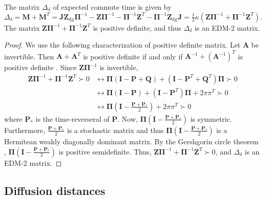 \begin{proposition}
  \label{prop:10}
  The matrix $\Delta_{\delta}$ of expected commute time is given by 
  \begin{equation}
    \label{eq:33}
 \Delta_{\delta} = \bm{M} + \bm{M}^{T}
  = \bm{J}\bm{Z}_{\mathrm{dg}}\bm{\Pi}^{-1} - \bm{Z}\bm{\Pi}^{-1} -
  \bm{\Pi}^{-1}\bm{Z}^{T} - \bm{\Pi}^{-1}\bm{Z}_{\mathrm{dg}} \bm{J} =
  \tfrac{1}{2} \kappa(\bm{Z}\bm{\Pi}^{-1} +
  \bm{\Pi}^{-1}\bm{Z}^{T}).   
  \end{equation}
  The matrix $\bm{Z}\bm{\Pi}^{-1} + \bm{\Pi}^{-1}\bm{Z}^{T}$ is
  positive definite, and thus $\Delta_{\delta}$ is an EDM-2
  matrix.
\end{proposition}
\begin{proof}
  We use the following characterization of positive definite
  matrix. Let $\bm{A}$ be invertible. Then $\bm{A} + \bm{A}^{T}$ is positive definite if and only if
  $\bm{A}^{-1} + (\bm{A}^{-1})^{T}$ is positive definite
  \cite{horn94:_topic_in_matrix_analy}. Since $\bm{Z}\bm{\Pi}^{-1}$ is
  invertible,
  \begin{equation}
    \label{eq:34}
    \begin{split}
    \bm{Z}\bm{\Pi}^{-1} + \bm{\Pi}^{-1}\bm{Z}^{T} \succ 0
    & \leftrightarrow \bm{\Pi}(\bm{I} - \bm{P} + \bm{Q}) + (\bm{I} -
    \bm{P}^{T} + \bm{Q}^{T})\bm{\Pi} \succ 0 \\
    & \leftrightarrow \bm{\Pi}(\bm{I} - \bm{P}) + (\bm{I} -
    \bm{P}^{T})\bm{\Pi} + 2 \pi \pi^{T} \succ 0 \\
    & \leftrightarrow \bm{\Pi}(\bm{I} - \frac{\bm{P} + \bm{P}_{*}}{2})
    + 2 \pi \pi^{T} \succ 0
  \end{split}      
  \end{equation}
  where $\bm{P}_{*}$ is the time-reverseral of $\bm{P}$. Now,
  $\bm{\Pi}(\bm{I} - \frac{\bm{P} + \bm{P}_{*}}{2})$ is
  symmetric. Furthermore, $\frac{\bm{P} + \bm{P}_{*}}{2}$ is a
  stochastic matrix and thus $\bm{\Pi}(\bm{I} - \frac{\bm{P} +
    \bm{P}_{*}}{2})$ is a Hermitean weakly diagonally dominant
  matrix. By the Gershgorin circle theorem
  \cite{horn94:_topic_in_matrix_analy}, $\bm{\Pi}(\bm{I} - \frac{\bm{P} +
    \bm{P}_{*}}{2})$ is positive semidefinite. Thus,
  $\bm{Z}\bm{\Pi}^{-1} + \bm{\Pi}^{-1}\bm{Z}^{T} \succ 0$, and
  $\Delta_{\delta}$ is an EDM-2 matrix.  
\end{proof}

\subsection{Diffusion distances}
\label{sec:diffusion-distances}



